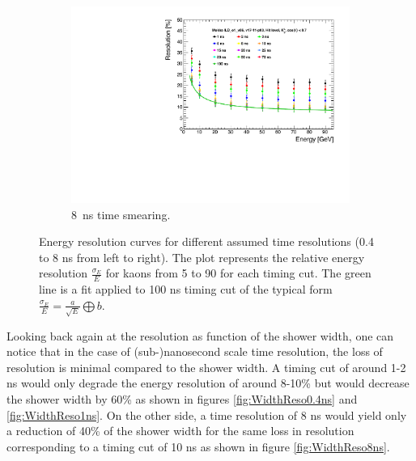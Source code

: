 \begin{figure}[t]
\begin{minipage}{1\textwidth}
  \end{minipage}
  \begin{subfigure}[t]{0.5\textwidth}
    \centering
    \includegraphics[width=1\linewidth]{chap6/fig_TimingILD/8ns_Smearing/ShowerResoAbsolute_TimeCuts_Smearing8ns}
    \caption{\SI{8}{\nano\second} time smearing.}  \label{fig:Reso8ns}
  \end{subfigure}
  \caption{Energy resolution curves for different assumed time resolutions (0.4 to 8 ns from left to right). The plot represents the relative energy resolution $\frac{\sigma_{E}}{E}$ for kaons from 5 to 90 \GeV for each timing cut. The green line is a fit applied to 100 ns timing cut of the typical form $\frac{\sigma_{E}}{E} = \frac{a}{\sqrt{E}} \bigoplus b$.}
\end{figure}

Looking back again at the resolution as function of the shower width, one can notice that in the case of (sub-)nanosecond scale time resolution, the loss of resolution is minimal compared to the shower width. A timing cut of around 1-2 ns would only degrade the energy resolution of around 8-10\% but would decrease the shower width by 60\% as shown in figures \ref{fig:WidthReso0.4ns} and \ref{fig:WidthReso1ns}. On the other side, a time resolution of 8 ns would yield only a reduction of 40\% of the shower width for the same loss in resolution corresponding to a timing cut of 10 ns as shown in figure \ref{fig:WidthReso8ns}.\\

